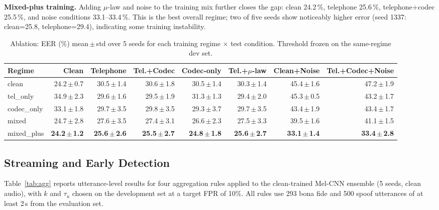 \documentclass[conference]{IEEEtran}
\begin{document}
\textbf{Mixed-plus training.} Adding $\mu$-law and noise to the training mix further closes the gap: clean 24.2\,\%, telephone 25.6\,\%, telephone+codec 25.5\,\%, and noise conditions 33.1--33.4\,\%. This is the best overall regime; two of five seeds show noticeably higher error (seed 1337: clean=25.8, telephone=29.4), indicating some training instability.

\begin{table}[htbp]
\caption{Ablation: EER (\%) mean\,$\pm$\,std over 5 seeds for each training regime $\times$ test condition. Threshold frozen on the same-regime dev set.}
\begin{center}
\begin{tabular}{lrrrrrrr}
\toprule
\textbf{Regime} & \textbf{Clean} & \textbf{Telephone} & \textbf{Tel.+Codec} & \textbf{Codec-only} & \textbf{Tel.+$\mu$-law} & \textbf{Clean+Noise} & \textbf{Tel.+Codec+Noise}\\
\midrule
clean      & 24.2\,$\pm$\,0.7 & 30.5\,$\pm$\,1.4 & 30.6\,$\pm$\,1.8 & 30.5\,$\pm$\,1.4 & 30.3\,$\pm$\,1.4 & 45.4\,$\pm$\,1.6 & 47.2\,$\pm$\,1.9\\
tel\_only  & 34.9\,$\pm$\,2.3 & 29.6\,$\pm$\,1.6 & 29.5\,$\pm$\,1.9 & 31.3\,$\pm$\,1.3 & 29.4\,$\pm$\,2.0 & 45.3\,$\pm$\,0.5 & 43.2\,$\pm$\,1.7\\
codec\_only& 33.1\,$\pm$\,1.8 & 29.7\,$\pm$\,3.5 & 29.8\,$\pm$\,3.5 & 29.3\,$\pm$\,3.7 & 29.7\,$\pm$\,3.5 & 43.4\,$\pm$\,1.9 & 43.4\,$\pm$\,1.7\\
mixed      & 24.7\,$\pm$\,2.8 & 27.6\,$\pm$\,3.5 & 27.4\,$\pm$\,3.1 & 26.6\,$\pm$\,2.3 & 27.5\,$\pm$\,3.3 & 39.5\,$\pm$\,1.6 & 41.1\,$\pm$\,1.5\\
mixed\_plus& \textbf{24.2\,$\pm$\,1.2} & \textbf{25.6\,$\pm$\,2.6} & \textbf{25.5\,$\pm$\,2.7} & \textbf{24.8\,$\pm$\,1.8} & \textbf{25.6\,$\pm$\,2.7} & \textbf{33.1\,$\pm$\,1.4} & \textbf{33.4\,$\pm$\,2.8}\\
\bottomrule
\end{tabular}
\label{tab:ablation}
\end{center}
\end{table}

\subsection{Streaming and Early Detection}

Table~\ref{tab:agg} reports utterance-level results for four aggregation rules applied to the clean-trained Mel-CNN ensemble (5 seeds, clean audio), with $k$ and $\tau_u$ chosen on the development set at a target FPR of 10\%. All rules use 293 bona fide and 500 spoof utterances of at least 2\,s from the evaluation set.
\end{document}
